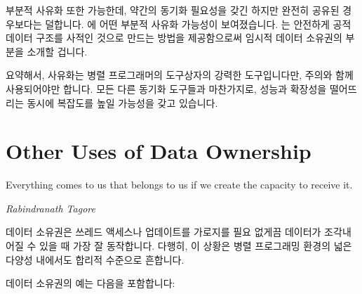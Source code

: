 부분적 사유화 또한 가능한데, 약간의 동기화 필요성을 갖긴 하지만 완전히 공유된
경우보다는 덜합니다.
 에 어떤 부분적 사유화 가능성이
보여졌습니다.
 는 안전하게 공적 데이터 구조를 사적인 것으로
만드는 방법을 제공함으로써 임시적 데이터 소유권의 부분을 소개할 겁니다.

요약해서, 사유화는 병렬 프로그래머의 도구상자의 강력한 도구입니다만, 주의와
함께 사용되어야만 합니다.
모든 다른 동기화 도구들과 마찬가지로, 성능과 확장성을 떨어뜨리는 동시에
복잡도를 높일 가능성을 갖고 있습니다.

\iffalse

Partial privatization is also possible, with some synchronization
requirements, but less than in the fully shared case.
Some partial-privatization possibilities were explored in
\cref{sec:toolsoftrade:Avoiding Data Races}.
\Cref{chp:Deferred Processing} will introduce a temporal component
to data ownership by providing ways of safely taking public data
structures private.

In short, privatization is a powerful tool in the parallel programmer's
toolbox, but it must nevertheless be used with care.
Just like every other synchronization primitive, it has the potential
to increase complexity while decreasing performance and scalability.

\fi

\section{Other Uses of Data Ownership}
\label{sec:owned:Other Uses of Data Ownership}
%
\epigraph{Everything comes to us that belongs to us if we create the
	  capacity to receive it.}
	 {\emph{Rabindranath Tagore}}

데이터 소유권은 쓰레드 액세스나 업데이트를 가로지를 필요 없게끔 데이터가
조각내어질 수 있을 때 가장 잘 동작합니다.
다행히, 이 상황은 병렬 프로그래밍 환경의 넓은 다양성 내에서도 합리적 수준으로
흔합니다.

데이터 소유권의 예는 다음을 포함합니다:

\iffalse

Data ownership works best when the data can be partitioned so that there
is little or no need for cross thread access or update.
Fortunately, this situation is reasonably common, and in a wide variety
of parallel-programming environments.

Examples of data ownership include:

\fi

